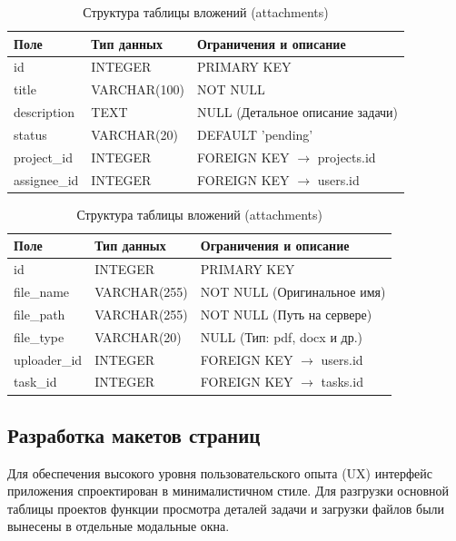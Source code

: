 \begin{table}[h!]
\caption{Структура таблицы задач (tasks)}
\label{tab:tasks_db}
\begin{tabular}{|p{}|p{}|p{}|}
\hline
\textbf{Поле} & \textbf{Тип данных} & \textbf{Ограничения и описание} \\ \hline
id & INTEGER & PRIMARY KEY \\ \hline
title & VARCHAR(100) & NOT NULL \\ \hline
description & TEXT & NULL (Детальное описание задачи) \\ \hline
status & VARCHAR(20) & DEFAULT 'pending' \\ \hline
project\_id & INTEGER & FOREIGN KEY $\rightarrow$ projects.id \\ \hline
assignee\_id & INTEGER & FOREIGN KEY $\rightarrow$ users.id \\ \hline
\end{tabular}

\vspace{0.5cm}

\caption{Структура таблицы вложений (attachments)}
\label{tab:attachments_db}
\begin{tabular}{|p{}|p{}|p{}|}
\hline
\textbf{Поле} & \textbf{Тип данных} & \textbf{Ограничения и описание} \\ \hline
id & INTEGER & PRIMARY KEY \\ \hline
file\_name & VARCHAR(255) & NOT NULL (Оригинальное имя) \\ \hline
file\_path & VARCHAR(255) & NOT NULL (Путь на сервере) \\ \hline
file\_type & VARCHAR(20) & NULL (Тип: pdf, docx и др.) \\ \hline
uploader\_id & INTEGER & FOREIGN KEY $\rightarrow$ users.id \\ \hline
task\_id & INTEGER & FOREIGN KEY $\rightarrow$ tasks.id \\ \hline
\end{tabular}
\end{table}

\clearpage

\subsection{Разработка макетов страниц}

Для обеспечения высокого уровня пользовательского опыта (UX) интерфейс приложения спроектирован в минималистичном стиле. Для разгрузки основной таблицы проектов функции просмотра деталей задачи и загрузки файлов были вынесены в отдельные модальные окна.

